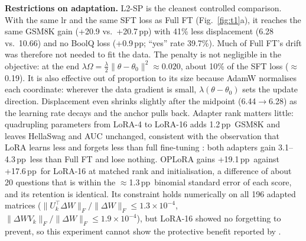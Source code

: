 \documentclass{article}
\newcommand{\pp}{\,pp}
\begin{document}
\textbf{Restrictions on adaptation.} L2-SP is the cleanest controlled comparison. With the same lr and the same SFT loss as Full FT (Fig.~\ref{fig:t1}a), it reaches the same GSM8K gain (+20.9 vs.\ +20.7\pp) with 41\% less displacement (6.28 vs.\ 10.66) and no BoolQ loss (+0.9\pp; ``yes'' rate 39.7\%). Much of Full FT's drift was therefore not needed to fit the data. The penalty is not negligible in the objective: at the end $\lambda\Omega=\tfrac{\lambda}{2}\|\theta{-}\theta_0\|^2\approx0.020$, about 10\% of the SFT loss ($\approx$0.19). It is also effective out of proportion to its size because AdamW normalises each coordinate: wherever the data gradient is small, $\lambda(\theta-\theta_0)$ sets the update direction. Displacement even shrinks slightly after the midpoint (6.44$\to$6.28) as the learning rate decays and the anchor pulls back. Adapter rank matters little: quadrupling parameters from LoRA-4 to LoRA-16 adds 1.2\pp\ GSM8K and leaves HellaSwag and AUC unchanged, consistent with the observation that LoRA learns less and forgets less than full fine-tuning \citep{biderman2024lora}: both adapters gain 3.1--4.3\pp\ less than Full FT and lose nothing. OPLoRA gains +19.1\pp\ against +17.6\pp\ for LoRA-16 at matched rank and initialisation, a difference of about 20 questions that is within the $\approx$1.3\pp\ binomial standard error of each score, and its retention is identical. Its constraint holds numerically on all 196 adapted matrices ($\|U_k^{\top}\Delta W\|_F/\|\Delta W\|_F\le1.3{\times}10^{-4}$, $\|\Delta W V_k\|_F/\|\Delta W\|_F\le1.9{\times}10^{-4}$), but LoRA-16 showed no forgetting to prevent, so this experiment cannot show the protective benefit reported by \citet{xiong2026oplora}.
\end{document}
